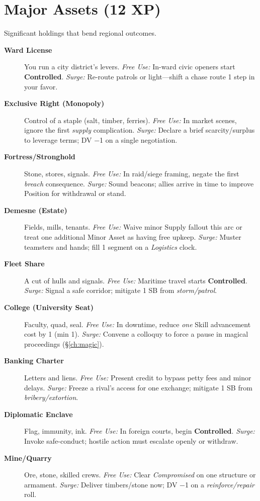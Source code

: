 \section{Major Assets (12 XP)}
Significant holdings that bend regional outcomes.
\begin{description}
  \item[\textbf{Ward License}]  You run a city district’s levers. \emph{Free Use:} In-ward civic openers start \textbf{Controlled}. \emph{Surge:} Re-route patrols or light—shift a chase route 1 step in your favor.
  \item[\textbf{Exclusive Right (Monopoly)}]  Control of a staple (salt, timber, ferries). \emph{Free Use:} In market scenes, ignore the first \emph{supply} complication. \emph{Surge:} Declare a brief scarcity/surplus to leverage terms; DV −1 on a single negotiation.
  \item[\textbf{Fortress/Stronghold}]  Stone, stores, signals. \emph{Free Use:} In raid/siege framing, negate the first \emph{breach} consequence. \emph{Surge:} Sound beacons; allies arrive in time to improve Position for withdrawal or stand.
  \item[\textbf{Demesne (Estate)}]  Fields, mills, tenants. \emph{Free Use:} Waive minor Supply fallout this arc or treat one additional Minor Asset as having free upkeep. \emph{Surge:} Muster teamsters and hands; fill 1 segment on a \emph{Logistics} clock.
  \item[\textbf{Fleet Share}]  A cut of hulls and signals. \emph{Free Use:} Maritime travel starts \textbf{Controlled}. \emph{Surge:} Signal a safe corridor; mitigate 1 SB from \emph{storm/patrol}.
  \item[\textbf{College (University Seat)}]  Faculty, quad, seal. \emph{Free Use:} In downtime, reduce \emph{one} Skill advancement cost by 1 (min 1). \emph{Surge:} Convene a colloquy to force a pause in magical proceedings (\S\ref{ch:magic}).
  \item[\textbf{Banking Charter}]  Letters and liens. \emph{Free Use:} Present credit to bypass petty fees and minor delays. \emph{Surge:} Freeze a rival’s access for one exchange; mitigate 1 SB from \emph{bribery/extortion}.
  \item[\textbf{Diplomatic Enclave}]  Flag, immunity, ink. \emph{Free Use:} In foreign courts, begin \textbf{Controlled}. \emph{Surge:} Invoke safe-conduct; hostile action must escalate openly or withdraw.
  \item[\textbf{Mine/Quarry}]  Ore, stone, skilled crews. \emph{Free Use:} Clear \emph{Compromised} on one structure or armament. \emph{Surge:} Deliver timbers/stone now; DV −1 on a \emph{reinforce/repair} roll.
\end{description}

